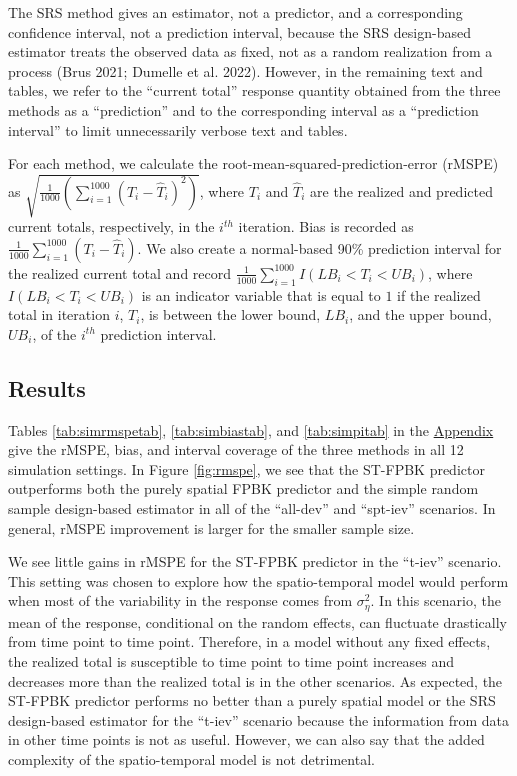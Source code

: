 \documentclass[smallextended]{svjour3}       %
\begin{document}
The SRS method gives an estimator, not a predictor, and a corresponding
confidence interval, not a prediction interval, because the SRS
design-based estimator treats the observed data as fixed, not as a
random realization from a process (Brus 2021; Dumelle et al. 2022).
However, in the remaining text and tables, we refer to the ``current
total'' response quantity obtained from the three methods as a
``prediction'' and to the corresponding interval as a ``prediction
interval'' to limit unnecessarily verbose text and tables.

For each method, we calculate the root-mean-squared-prediction-error
(rMSPE) as
\(\sqrt{\frac{1}{1000}(\sum_{i = 1}^{1000}(T_i - \hat{T}_i)^2)}\), where
\(T_i\) and \(\hat{T}_i\) are the realized and predicted current totals,
respectively, in the \(i^{th}\) iteration. Bias is recorded as
\(\frac{1}{1000}\sum_{i = 1}^{1000}(T_i - \hat{T}_i)\). We also create a
normal-based 90\% prediction interval for the realized current total and
record \(\frac{1}{1000} \sum_{i = 1}^{1000}I(LB_i < T_i < UB_i)\), where
\(I(LB_i < T_i < UB_i)\) is an indicator variable that is equal to \(1\)
if the realized total in iteration \(i\), \(T_i\), is between the lower
bound, \(LB_i\), and the upper bound, \(UB_i\), of the \(i^{th}\)
prediction interval.

\hypertarget{results}{%
\subsection{Results}\label{results}}

Tables \ref{tab:simrmspetab}, \ref{tab:simbiastab}, and
\ref{tab:simpitab} in the \protect\hyperlink{appendix}{Appendix} give
the rMSPE, bias, and interval coverage of the three methods in all 12
simulation settings. In Figure \ref{fig:rmspe}, we see that the ST-FPBK
predictor outperforms both the purely spatial FPBK predictor and the
simple random sample design-based estimator in all of the ``all-dev''
and ``spt-iev'' scenarios. In general, rMSPE improvement is larger for
the smaller sample size.

We see little gains in rMSPE for the ST-FPBK predictor in the ``t-iev''
scenario. This setting was chosen to explore how the spatio-temporal
model would perform when most of the variability in the response comes
from \(\sigma^2_{\eta}\). In this scenario, the mean of the response,
conditional on the random effects, can fluctuate drastically from time
point to time point. Therefore, in a model without any fixed effects,
the realized total is susceptible to time point to time point increases
and decreases more than the realized total is in the other scenarios. As
expected, the ST-FPBK predictor performs no better than a purely spatial
model or the SRS design-based estimator for the ``t-iev'' scenario
because the information from data in other time points is not as useful.
However, we can also say that the added complexity of the
spatio-temporal model is not detrimental.
\end{document}

